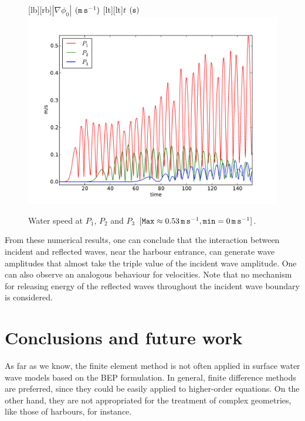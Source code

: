 \begin{figure}[!htb]
{\centering
{}[lb][rb]{$|\nabla \phi_0|$ $({\tt m\,s}^{-1})$}
[lt][lt]{$t$ $({\tt s})$}
\includegraphics[width=\largewidth]{chapters/lopes/pdf/velprofile.pdf}
\caption{Water speed  at $P_1$, $P_2$ and $P_3$
\([{\tt Max}\approx 0.53\, {\tt m\, s}^{-1}, {\tt min}=0\,{\tt m\, s}^{-1}]\).}\label{lopes:fig:velp}\par}
\end{figure}

From these numerical results, one can conclude that the
interaction between incident and reflected waves, near the harbour entrance,
 can generate wave amplitudes that  almost  take the
 triple value  of the incident wave amplitude.
One can also observe an analogous behaviour for
velocities.
Note that no
mechanism for releasing energy of the reflected waves
throughout the incident wave boundary is considered.


\section{Conclusions and future work}

As far as we know,  the finite element
method is not often applied in surface water wave models
based on the BEP formulation.
In general, finite difference methods are preferred, since
they could be easily applied to higher-order equations.
On the  other hand, they are not appropriated for the
treatment of complex geometries, like those of harbours,
for instance.

